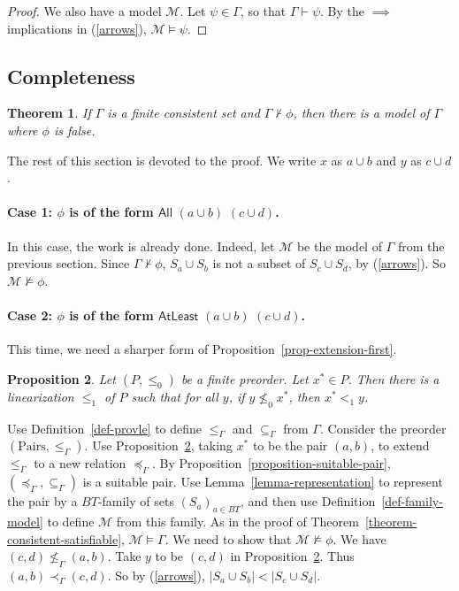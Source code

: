 \documentclass[letterpaper]{article} %
\newtheorem{theorem}{Theorem}[section]
\newtheorem{proposition}[theorem]{Proposition}
\theoremstyle{definition}
\newcommand{\Model}{\mathcal{M}}
\newcommand{\proves}{\vdash}
\newcommand{\All}[2]{\mathsf{All}\,\,#1\,\,#2}
\newcommand{\Atleast}[2]{\mathsf{AtLeast}\,\,#1\,\,#2}
\newcommand{\Pairs}{\mbox{Pairs}}
\newcommand{\provsub}{\subseteq_{\Gamma}}
\newcommand{\provle}{\le_{\Gamma}}
\newcommand{\nprovle}{\nleq_{\Gamma}}
\newcommand{\provextended}{\preceq_{\Gamma}}
\newcommand{\provextendedstrict}{\prec_{\Gamma}}
\begin{document}
{\begin{proof}
 We also have a model $\Model$.
Let $\psi\in\Gamma$, so that $\Gamma\proves \psi$.
By the $\implies$
 implications in (\ref{arrows}),  $\Model\models\psi$.
\end{proof}
 
 \subsection{Completeness}
 \label{section-completeness}
 
\begin{theorem} If $\Gamma$ is a finite consistent set and $\Gamma\not\proves\phi$,
 then there is a model of $\Gamma$ where $\phi$ is false.
 \end{theorem}
 
 The rest of this section is devoted to the proof.
 We write $x$ as $a\cup b$ and $y$ as $c\cup d$.
 
 \paragraph{Case 1: $\phi$ is of the form $\All{(a\cup b)}{(c\cup d)}$.} 
 In this case, the work is already done. Indeed, let $\Model$ be the model of $\Gamma$ from
 the previous section. 
 Since $\Gamma\not\proves\phi$, $S_a\cup S_b$ is not a subset of $S_c\cup S_d$,
  by (\ref{arrows}).  So $\Model\not\models\phi$.

 \paragraph{Case 2: $\phi$ is of the form $\Atleast{(a\cup b)}{(c\cup d)}$.} 
 
 This time, we need a sharper form of Proposition~\ref{prop-extension-first}.
 
 \begin{proposition}
\label{prop-extension-second}
Let $(P,\leq_0)$ be a finite preorder.  
Let $x^*\in P$.  Then there is a linearization $\leq_1$ of $P$ 
such that for all $y$, if $y \nleq_0 x^*$, then $x^* <_1 y$.
\end{proposition}

 
Use Definition~\ref{def-provle}
to define $\provle$ and $\provsub$ from $\Gamma$.  
Consider the preorder $(\Pairs,\provle)$.   
 Use
Proposition~\ref{prop-extension-second},  taking $x^*$ to be the pair $(a,b)$, to 
 extend $\provle$ to a new relation $\provextended$.
 By Proposition~\ref{proposition-suitable-pair}, $(\provextended,\provsub)$  is a suitable pair.
Use 
  Lemma~\ref{lemma-representation} to represent the pair by a 
  $BT$-family of sets $(S_a)_{a\in BT}$, and then 
  use Definition~\ref{def-family-model} to define $\Model$ from this family.
As in  
 the proof of Theorem~\ref{theorem-consistent-satisfiable},
 $\Model\models\Gamma$.
We need to show that $\Model\not\models\phi$.
We have $(c,d) \nprovle (a,b)$.  
Take $y$ to be $(c,d)$ in 
  Proposition~\ref{prop-extension-second}.
Thus $(a,b) \provextendedstrict (c,d)$.   So by (\ref{arrows}), 
 $ |S_a \cup S_b| < |S_c \cup S_d|$.


}
\end{document}
